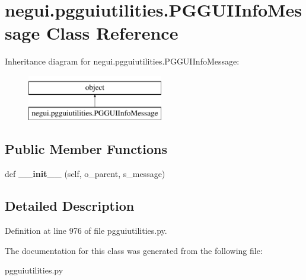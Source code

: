 \hypertarget{classnegui_1_1pgguiutilities_1_1PGGUIInfoMessage}{}\section{negui.\+pgguiutilities.\+P\+G\+G\+U\+I\+Info\+Message Class Reference}
\label{classnegui_1_1pgguiutilities_1_1PGGUIInfoMessage}
Inheritance diagram for negui.\+pgguiutilities.\+P\+G\+G\+U\+I\+Info\+Message\+:\begin{figure}[H]
\begin{center}
\leavevmode
\includegraphics[height=2.000000cm]{classnegui_1_1pgguiutilities_1_1PGGUIInfoMessage}
\end{center}
\end{figure}
\subsection*{Public Member Functions}
\begin{DoxyCompactItemize}
\item 
def {\bfseries \+\_\+\+\_\+init\+\_\+\+\_\+} (self, o\+\_\+parent, s\+\_\+message)\hypertarget{classnegui_1_1pgguiutilities_1_1PGGUIInfoMessage_a6610dd669862924d49f1ec400b4df128}{}\label{classnegui_1_1pgguiutilities_1_1PGGUIInfoMessage_a6610dd669862924d49f1ec400b4df128}

\end{DoxyCompactItemize}


\subsection{Detailed Description}


Definition at line 976 of file pgguiutilities.\+py.



The documentation for this class was generated from the following file\+:\begin{DoxyCompactItemize}
\item 
pgguiutilities.\+py\end{DoxyCompactItemize}
